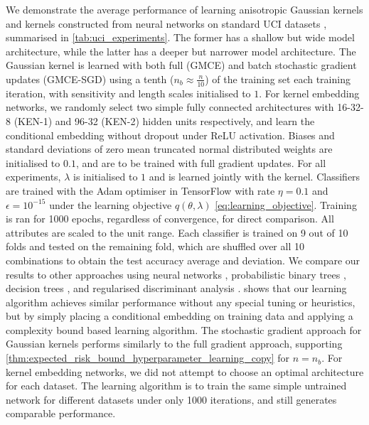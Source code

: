 \documentclass[twoside]{article}
\begin{document}
	We demonstrate the average performance of learning anisotropic Gaussian kernels and kernels constructed from neural networks on standard UCI datasets \citep{bache2013uci}, summarised in \cref{tab:uci_experiments}. The former has a shallow but wide model architecture, while the latter has a deeper but narrower model architecture. The Gaussian kernel is learned with both full (G\gls{MCE}) and batch stochastic gradient updates (G\gls{MCE}-SGD) using a tenth ($n_{b} \approx \frac{n}{10}$) of the training set each training iteration, with sensitivity and length scales initialised to $1$. For kernel embedding networks, we randomly select two simple fully connected architectures with 16-32-8 (KEN-1) and 96-32 (KEN-2) hidden units respectively, and learn the conditional embedding without dropout under ReLU activation. Biases and standard deviations of zero mean truncated normal distributed weights are initialised to $0.1$, and are to be trained with full gradient updates. For all experiments, $\lambda$ is initialised to $1$ and is learned jointly with the kernel. Classifiers are trained with the Adam optimiser \citep{kingma2014adam} in TensorFlow \citep{abadi2016tensorflow} with rate $\eta = 0.1$ and $\epsilon = 10^{-15}$ under the learning objective $q(\theta, \lambda)$ \eqref{eq:learning_objective}. Training is ran for 1000 epochs, regardless of convergence, for direct comparison. All attributes are scaled to the unit range. Each classifier is trained on 9 out of 10 folds and tested on the remaining fold, which are shuffled over all 10 combinations to obtain the test accuracy average and deviation. We compare our results to other approaches using neural networks \citep[a; c]{kaya2016banknote, freire2009short}, probabilistic binary trees \citep[b]{horton1996probabilistic}, decision trees \citep[d]{zhou2004size}, and regularised discriminant analysis \citep[e]{aeberhard1992comparison}.  shows that our learning algorithm achieves similar performance without any special tuning or heuristics, but by simply placing a conditional embedding on training data and applying a complexity bound based learning algorithm. The stochastic gradient approach for Gaussian kernels performs similarly to the full gradient approach, supporting \cref{thm:expected_risk_bound_hyperparameter_learning_copy} for $n = n_{b}$. For kernel embedding networks, we did not attempt to choose an optimal architecture for each dataset. The learning algorithm is to train the same simple untrained network for different datasets under only 1000 iterations, and still generates comparable performance. 
	
\end{document}
